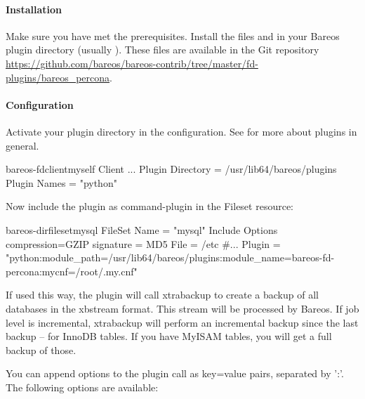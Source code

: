 \paragraph{Installation}

Make sure you have met the prerequisites.
Install the files  and  in your Bareos plugin directory (usually ). These files are available
in the Git repository \url{https://github.com/bareos/bareos-contrib/tree/master/fd-plugins/bareos_percona}.

\paragraph{Configuration}

Activate your plugin directory in the \bareosFd configuration. See  for more about plugins in general.

\begin{bareosConfigResource}{bareos-fd}{client}{myself}
Client {
  ...
  Plugin Directory = /usr/lib64/bareos/plugins
  Plugin Names = "python"
}
\end{bareosConfigResource}

Now include the plugin as command-plugin in the Fileset resource:

\begin{bareosConfigResource}{bareos-dir}{fileset}{mysql}
FileSet {
    Name = "mysql"
    Include  {
        Options {
            compression=GZIP
            signature = MD5
        }
        File = /etc
        #...
        Plugin = "python:module_path=/usr/lib64/bareos/plugins:module_name=bareos-fd-percona:mycnf=/root/.my.cnf"
    }
}
\end{bareosConfigResource}

If used this way, the plugin will call xtrabackup to create a backup of all databases in the xbstream format.
This stream will be processed by Bareos. If job level is incremental,
xtrabackup will perform an incremental backup since the last backup -- for InnoDB tables.
If you have MyISAM tables, you will get a full backup of those.

You can append options to the plugin call as key=value pairs, separated by ':'.
The following options are available:

